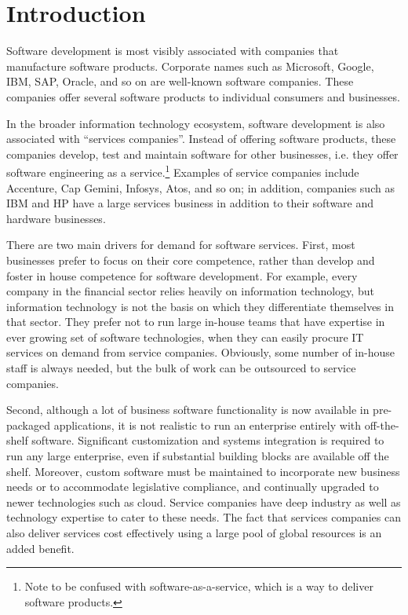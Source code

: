 \section{Introduction}

Software development is most visibly associated with companies that manufacture software products.  Corporate names such as Microsoft, Google, IBM, SAP, Oracle, and so on are well-known software companies.  These companies offer several software  products to individual consumers and businesses.

In the broader information technology ecosystem, software development is also associated with ``services companies''.  Instead of offering software products, these companies develop, test and maintain software for other businesses, i.e. they offer software engineering as a service.\footnote{Note to be confused with software-as-a-service, which is a way to deliver software products.} Examples of service companies include Accenture, Cap Gemini, Infosys, Atos, and so on; in addition, companies such as IBM and HP have a large services business in addition to their software and hardware businesses.

There are two main drivers for demand for software services.  First, most businesses prefer to focus on their core competence, rather than develop and foster in house competence for software development.  For example, every company in the financial sector relies heavily on information technology, but information technology is not the basis on which they differentiate themselves in that sector. They prefer not to run large in-house teams that have expertise in ever growing set of software technologies, when they can easily procure IT services on demand from service companies. Obviously, some number of in-house staff is always needed, but the bulk of work can be outsourced to service companies.

Second, although a lot of business software functionality is now available in pre-packaged applications, it is not realistic to run an enterprise entirely with off-the-shelf software. Significant customization and systems integration is required to run any large enterprise, even if substantial building blocks are available off the shelf. Moreover, custom software must be maintained to incorporate new business needs or to accommodate legislative compliance, and continually upgraded to newer technologies such as cloud. Service companies have deep industry as well as technology expertise to cater to these needs. The fact that services companies can also deliver services cost effectively using a large pool of global resources is an added benefit. 

